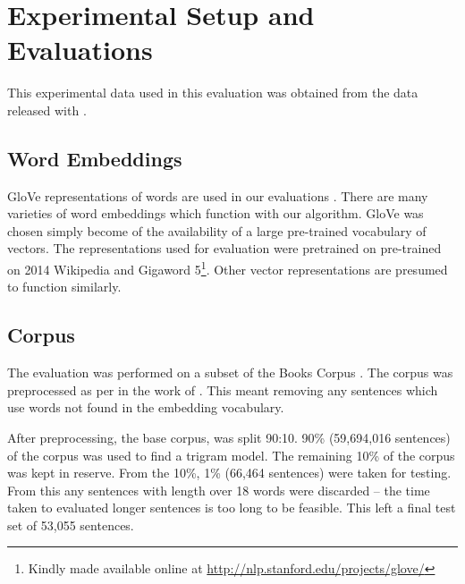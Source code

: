 \documentclass[11pt]{article}
\theoremstyle{plain}
\theoremstyle{definition}
\begin{document}
\begin{comment}
\end{comment}



\section{Experimental Setup and Evaluations} \label{evalsettings}


This experimental data used in this evaluation was obtained from the data released with .

\subsection{Word Embeddings}
GloVe representations of words are used in our evaluations \parencite{pennington2014glove}. There are many varieties of word embeddings which function with our algorithm. GloVe was chosen simply become of the availability of a large pre-trained vocabulary of vectors. The representations used for evaluation were pretrained on pre-trained on 2014 Wikipedia and Gigaword 5\footnote{Kindly made available online at \url{http://nlp.stanford.edu/projects/glove/}}.  Other vector representations are presumed to function similarly.

\subsection{Corpus}
The evaluation was performed on a subset of the Books Corpus \parencite{moviebook}. The corpus was preprocessed as per in the work of \textcite{White2015BOWgen}. This meant removing any sentences which use words not found in the embedding vocabulary.

After preprocessing, the base corpus, was split 90:10. 90\% (59,694,016 sentences) of the corpus was used to find a trigram model. The remaining 10\% of the corpus was kept in reserve. From the 10\%, 1\% (66,464 sentences) were taken for testing. From this any sentences with length over 18 words were discarded -- the time taken to evaluated longer sentences is too long to be feasible. This left a final test set of 53,055 sentences.
 
\end{document}
